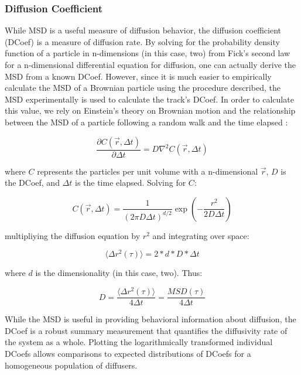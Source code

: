 \documentclass{bioinfo}
\begin{document}
\subsubsection{Diffusion Coefficient}

While MSD is a useful measure of diffusion behavior, the diffusion coefficient (DCoef) is a measure of diffusion rate. By solving for the probability density function of a particle in n-dimensions (in this case, two) from Fick's second law for a n-dimensional differential equation for diffusion, one can actually derive the MSD from a known DCoef. However, since it is much easier to empirically calculate the MSD of a Brownian particle using the procedure described, the MSD experimentally is used to calculate the track's DCoef. In order to calculate this value, we rely on Einstein's theory on Brownian motion and the relationship between the MSD of a particle following a random walk and the time elapsed \citep{Einstein}:

\begin{equation}
\frac{\partial C(\vec{r}, \Delta t)}{\partial \Delta t} = D \nabla^2C(\vec{r}, \Delta t)\label{eq:07}
\end{equation}

where $C$ represents the particles per unit volume with a n-dimensional $\vec{r}$, $D$ is the DCoef, and $\Delta t$ is the time elapsed. Solving for $C$:

\begin{equation}
C(\vec{r}, \Delta t) = \frac{1}{(2 \pi D \Delta t)^{d/2}}\exp{\left( -\frac{r^2}{2 D \Delta t} \right)}\label{eq:08}
\end{equation}

multipliying the diffusion equation by $r^2$ and integrating over space:

\begin{equation}
\Big \langle \Delta r^2(\tau) \Big \rangle = 2 * d * D * \Delta t\label{eq:09}
\end{equation}

where $d$ is the dimensionality (in this case, two). Thus:

\begin{equation}
D = \frac{\Big \langle \Delta r^2(\tau) \Big \rangle}{4 \Delta t}  = \frac{MSD(\tau)}{4 \Delta t} \label{eq:10}
\end{equation}

While the MSD is useful in providing behavioral information about diffusion, the DCoef is a robust summary measurement that quantifies the diffusivity rate of the system as a whole. Plotting the logarithmically transformed individual DCoefs allows comparisons to expected distributions of DCoefs for a homogeneous population of diffusers.
\end{document}
